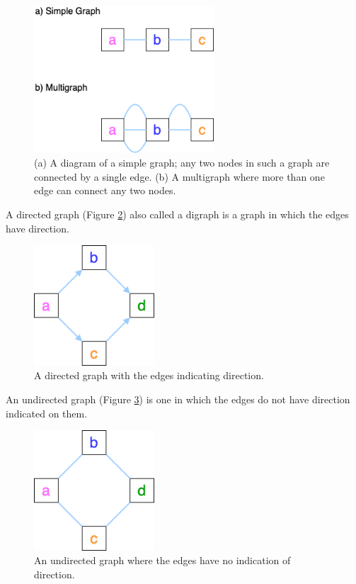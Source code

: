 \documentclass[10pt, a4paper]{article}
\begin{document}
\begin{figure}[!ht]
\centering
\includegraphics[width=0.6\textwidth]{../Figures/Simple-and-Multigraph.png}
\caption[A simple graph and a multigraph]{\label{fig:org6c9bad4}(a) A diagram of a simple graph; any two nodes in such a graph are connected by a single edge. (b) A multigraph where more than one edge can connect any two nodes.}
\end{figure}

A directed graph (Figure \ref{fig:org284ec94}) also called a digraph is a graph in which the edges have
direction.

\begin{figure}[!ht]
\centering
\includegraphics[width=0.4\textwidth]{../Figures/Digraph.png}
\caption[A Directed Graph]{\label{fig:org284ec94}A directed graph with the edges indicating direction.}
\end{figure}

An undirected graph (Figure \ref{fig:org65c1330}) is one in which the edges do
not have direction indicated on them.

\begin{figure}[!ht]
\centering
\includegraphics[width=0.4\textwidth]{../Figures/Undirected.png}
\caption[An Undirected Graph]{\label{fig:org65c1330}An undirected graph where the edges have no indication of direction.}
\end{figure}
\end{document}
